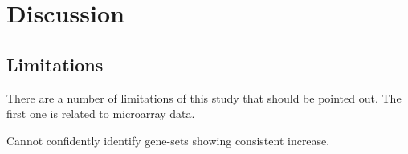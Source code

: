 \chapter{Discussion}
\label{chp:b4}


\section{Limitations}

There are a number of limitations of this study that should be pointed out. The first one is related to microarray data. 



Cannot confidently identify gene-sets showing consistent increase.
